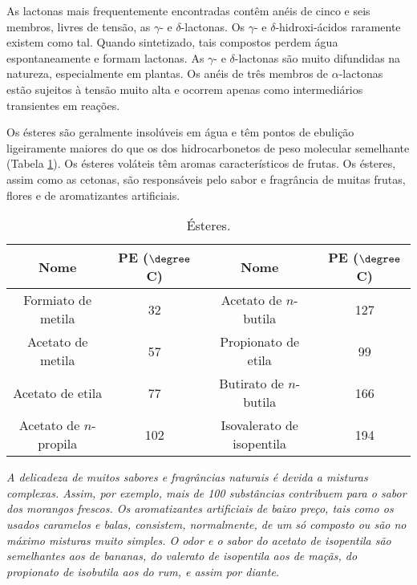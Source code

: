 \noindent As lactonas mais frequentemente encontradas contêm anéis de cinco e seis membros, livres de tensão, as $\gamma$- e $\delta$-lactonas. Os $\gamma$- e $\delta$-hidroxi-ácidos raramente existem como tal. Quando sintetizado, tais compostos perdem água espontaneamente e formam lactonas. As $\gamma$- e $\delta$-lactonas são muito difundidas na natureza, especialmente em plantas. Os anéis de três membros de $\alpha$-lactonas estão sujeitos à tensão muito alta e ocorrem apenas como intermediários transientes em reações.

\begin{tightcenter}
    \chemnameinit{}
    \qquad\qquad
    \qquad\qquad
\end{tightcenter}

Os ésteres são geralmente insolúveis em água e têm pontos de ebulição ligeiramente maiores do que os dos hidrocarbonetos de peso molecular semelhante (Tabela \ref{tab8_3}). Os ésteres voláteis têm aromas característicos de frutas. Os ésteres, assim como as cetonas, são responsáveis pelo sabor e fragrância de muitas frutas, flores e de aromatizantes artificiais.

\begin{table}[H]
    \centering
    \caption{Ésteres.}
    \label{tab8_3}
    \begin{tabular}{cccc}
        \toprule
        Nome & PE ($\degree$C) & Nome & PE ($\degree$C)  \\
        \midrule
        Formiato de metila & 32 & Acetato de $n$-butila & 127 \\
        Acetato de metila & 57 & Propionato de etila & 99 \\
        Acetato de etila & 77 & Butirato de $n$-butila & 166 \\
        Acetato de $n$-propila & 102 & Isovalerato de isopentila & 194 \\
        \bottomrule
    \end{tabular}
\end{table}

\par\bigskip
\noindent\emph{A delicadeza de muitos sabores e fragrâncias naturais é devida a misturas complexas. Assim, por exemplo, mais de 100 substâncias contribuem para o sabor dos morangos frescos. Os aromatizantes artificiais de baixo preço, tais como os usados caramelos e balas, consistem, normalmente, de um só composto ou são no máximo misturas muito simples. O odor e o sabor do acetato de isopentila são semelhantes aos de bananas, do valerato de isopentila aos de maçãs, do propionato de isobutila aos do rum, e assim por diante.}

